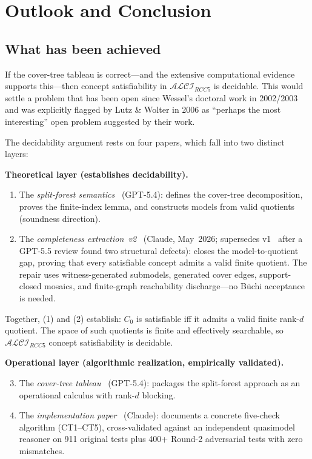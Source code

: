 \documentclass[
]{ceurart}
\theoremstyle{definition}
\newcommand{\ALCIRCC}[1]{\ensuremath{\mathcal{ALCI}_{\mathit{RCC#1}}}}
\begin{document}
\section{Outlook and Conclusion}
\label{sec:outlook}

\subsection{What has been achieved}

If the cover-tree tableau is correct---and the extensive
computational evidence supports this---then concept satisfiability
in $\ALCIRCC{5}$ is decidable.  This would settle a problem that
has been open since Wessel's doctoral work in 2002/2003 and was
explicitly flagged by Lutz \& Wolter in 2006 as ``perhaps the
most interesting'' open problem suggested by their work.

The decidability argument rests on four papers, which fall into
two distinct layers:

\medskip\noindent\textbf{Theoretical layer (establishes
decidability).}
\begin{enumerate}
  \item The \emph{split-forest semantics}~\cite{SiblingCompleted}
    (GPT-5.4): defines the cover-tree decomposition, proves the
    finite-index lemma, and constructs models from valid
    quotients (soundness direction).
  \item The \emph{completeness extraction~v2}~\cite{CompletenessExtraction}
    (Claude, May~2026; supersedes
    v1~\cite{CompletenessExtractionV1} after a GPT-5.5 review
    found two structural defects): closes the model-to-quotient
    gap, proving that every satisfiable concept admits a valid
    finite quotient. The repair uses witness-generated submodels,
    generated cover edges, support-closed mosaics, and
    finite-graph reachability discharge---no B\"uchi acceptance is
    needed.
\end{enumerate}
Together, (1) and (2) establish: $C_0$ is satisfiable iff it
admits a valid finite rank-$d$ quotient.  The space of such
quotients is finite and effectively searchable, so
$\ALCIRCC{5}$ concept satisfiability is decidable.

\medskip\noindent\textbf{Operational layer (algorithmic
realization, empirically validated).}
\begin{enumerate}\setcounter{enumi}{2}
  \item The \emph{cover-tree tableau}~\cite{CoverTree} (GPT-5.4):
    packages the split-forest approach as an operational calculus
    with rank-$d$ blocking.
  \item The \emph{implementation paper}~\cite{CoverTreeImpl}
    (Claude): documents a concrete five-check algorithm (CT1--CT5),
    cross-validated against an independent quasimodel reasoner on
    911 original tests plus 400+ Round-2 adversarial tests with
    zero mismatches.
\end{enumerate}
\end{document}
